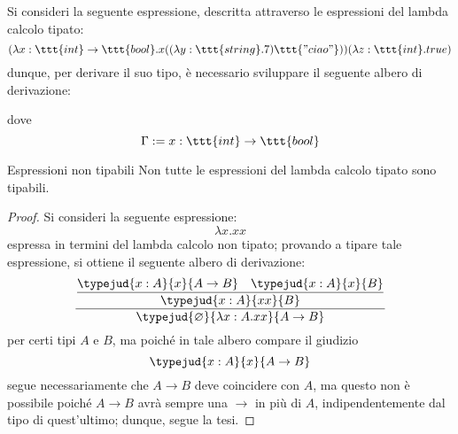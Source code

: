 \documentclass[a4paper, 12pt]{report}
\begin{document}
    \begin{example}
        Si consideri la seguente espressione, descritta attraverso le espressioni del lambda calcolo tipato: $$(\lambda x:\ttt{int}\to \ttt{bool}.x((\lambda y:\ttt{string}.7)\ttt{"ciao"}))(\lambda z: \ttt{int}.true)$$ dunque, per derivare il suo tipo, è necessario sviluppare il seguente albero di derivazione: 

        dove $$\Gamma := x: \ttt{int} \to \ttt{bool}$$
    \end{example}

    \begin{framedlem}{Espressioni non tipabili}
        Non tutte le espressioni del lambda calcolo tipato sono tipabili.
    \end{framedlem}

    \begin{proof}
        Si consideri la seguente espressione: $$\lambda x. xx$$ espressa in termini del lambda calcolo non tipato; provando a tipare tale espressione, si ottiene il seguente albero di derivazione: $$\dfrac{\dfrac{\typejud{x:A}{x}{A \to B} \quad \typejud{x:A}{x}{B}}{\typejud{x:A}{xx}{B}}}{\typejud{\varnothing}{\lambda x: A .xx}{A \to B}}$$ per certi tipi $A$ e $B$, ma poiché in tale albero compare il giudizio $$\typejud{x:A}{x}{A \to B}$$ segue necessariamente che $A \to B$ deve coincidere con $A$, ma questo non è possibile poiché $A \to B$ avrà sempre una $\to$ in più di $A$, indipendentemente dal tipo di quest'ultimo; dunque, segue la tesi.
    \end{proof}
\end{document}
